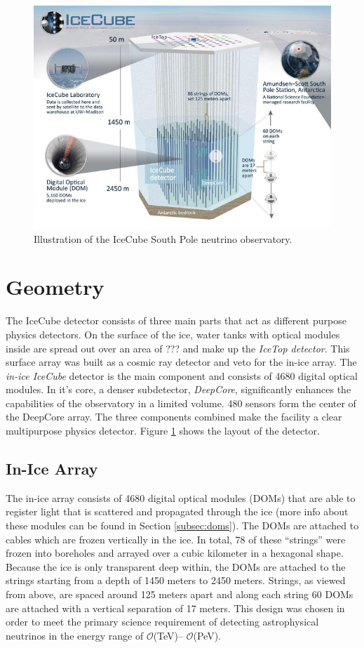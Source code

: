 \begin{figure}
\centering
\includegraphics[width=1.1\textwidth]{chapter5/img/icecube_detector.jpg}
\caption{Illustration of the IceCube South Pole neutrino observatory.}
\label{fig:ICgeometry}
\end{figure} 

\section{Geometry}
The IceCube detector consists of three main parts that act as different purpose physics detectors. On the surface of the ice, water tanks with optical modules inside are spread out over an area of ??? and make up the \textit{IceTop detector}. This surface array was built as a cosmic ray detector and veto for the in-ice array. The \textit{in-ice IceCube} detector is the main component and consists of 4680 digital optical modules. In it's core, a denser subdetector, \textit{DeepCore}, significantly enhances the capabilities of the observatory in a limited volume. 480 sensors form the center of the DeepCore array. The three components combined make the facility a clear multipurpose physics detector. Figure \ref{fig:ICgeometry} shows the layout of the detector.

\subsection{In-Ice Array}
The in-ice array consists of 4680 digital optical modules (DOMs) that are able to register light that is scattered and propagated through the ice (more info about these modules can be found in Section \ref{subsec:doms}). The DOMs are attached to cables which are frozen vertically in the ice. In total, 78 of these ``strings'' were frozen into boreholes and arrayed over a cubic kilometer in a hexagonal shape. Because the ice is only transparent deep within, the DOMs are attached to the strings starting from a depth of 1450 meters to 2450 meters. Strings, as viewed from above, are spaced around 125 meters apart and along each string 60 DOMs are attached with a vertical separation of 17 meters. This design was chosen
in order to meet the primary science requirement of detecting astrophysical neutrinos in the energy range of $\mathcal{O}$(TeV)– $\mathcal{O}$(PeV).

